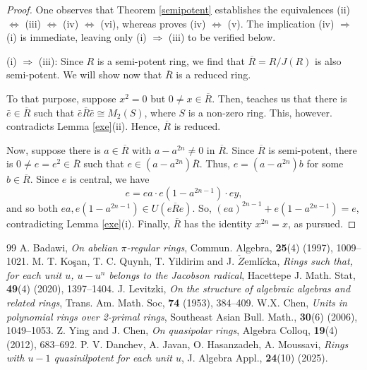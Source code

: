 \documentclass[10pt,a4paper]{amsart}
\begin{document}
\begin{proof}
One observes that Theorem \ref{semipotent} establishes the equivalences (ii) $\Leftrightarrow$ (iii) $\Leftrightarrow$ (iv) $\Leftrightarrow$ (vi), whereas \cite[Proposition 2.9]{3} proves (iv) $\Leftrightarrow$ (v). The implication (iv) $\Rightarrow$ (i) is immediate, leaving only (i) $\Rightarrow$ (iii) to be verified below.

(i) $\Rightarrow$ (iii): Since $R$ is a semi-potent ring, we find that $\overline{R} = R/J(R)$ is also semi-potent. We will show now that $\overline{R}$ is a reduced ring.

To that purpose, suppose $x^2 = 0$ but $0 \neq x \in \overline{R}$. Then, \cite[Theorem 2.1]{9} teaches us that there is $\bar{e} \in \overline{R}$ such that $\bar{e}\overline{R}\bar{e} \cong M_2(S)$, where $S$ is a non-zero ring. This, however. contradicts Lemma \ref{exe}(ii). Hence, $\overline{R}$ is reduced.

Now, suppose there is $a \in \overline{R}$ with $a - a^{2n} \neq 0$ in $\overline{R}$. Since $\overline{R}$ is semi-potent, there is $0\neq e = e^2 \in \overline{R}$ such that $e \in (a - a^{2n})\overline{R}$. Thus, $e = (a - a^{2n})b$ for some $b \in \overline{R}$. Since $e$ is central, we have $$e = ea \cdot e(1-a^{2n-1}) \cdot ey,$$ and so both $ea, e(1-a^{2n-1}) \in U(e\overline{R}e)$. So, $(ea)^{2n-1} + e(1-a^{2n-1}) = e$, contradicting Lemma \ref{exe}(i). Finally, $\overline{R}$ has the identity $x^{2n}=x$, as pursued.
\end{proof}


\begin{thebibliography}{99}
 A. Badawi, {\it On abelian $\pi$-regular rings}, Commun. Algebra, {\bf 25}(4) (1997), 1009--1021.
 M. T. Ko\c{s}an, T. C. Quynh, T. Yildirim and J. $\check{Z}$emli$\check{c}$ka, {\it Rings such that, for each unit $u$, $u - u^n$ belongs to the Jacobson radical}, Hacettepe J. Math. Stat, {\bf 49}(4) (2020), 1397--1404.
 J. Levitzki, {\it On the structure of algebraic algebras and related rings}, Trans. Am. Math. Soc, {\bf 74} (1953), 384--409.
 W.X. Chen, {\it Units in polynomial rings over 2-primal rings}, Southeast Asian Bull. Math., {\bf 30}(6) (2006), 1049--1053.
 Z. Ying and J. Chen, {\it On quasipolar rings}, Algebra Colloq, {\bf 19}(4) (2012), 683--692.
 P. V. Danchev, A. Javan, O. Hasanzadeh, A. Moussavi, {\it Rings with $u-1$ quasinilpotent for each unit $u$}, J. Algebra Appl., {\bf 24}(10) (2025).
\end{thebibliography}
\end{document}
